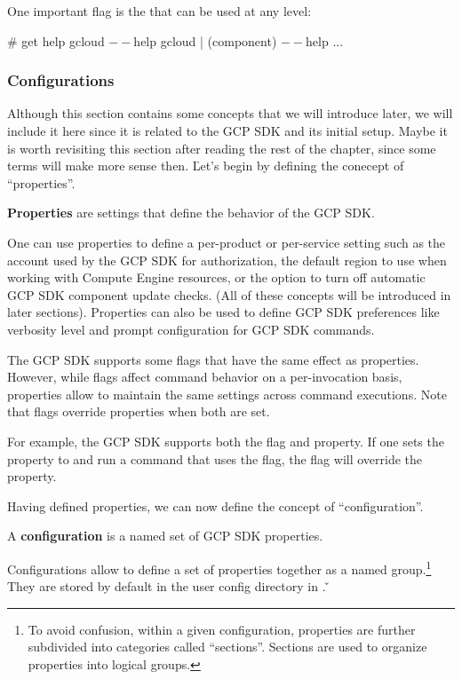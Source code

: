One important flag is the  that can be used at any  level:
\begin{bash}
# get help
gcloud $--$help
gcloud | (component) $--$help
...
\end{bash}

\subsubsection{Configurations}

Although this section contains some concepts that we will introduce later, we will include it here since it is related
to the GCP SDK and its initial setup. Maybe it is worth revisiting this section after reading the rest of the chapter,
since some terms will make more sense then. \v

Let's begin by defining the conecept of ``properties''.

\bd[Properties]
\textbf{Properties} are settings that define the behavior of the GCP SDK\@.
\ed

\be
One can use properties to define a per-product or per-service setting such as the account used by the GCP SDK for
authorization, the default region to use when working with Compute Engine resources, or the option to turn off
automatic GCP SDK component update checks. (All of these concepts will be introduced in later sections). Properties
can also be used to define GCP SDK preferences like verbosity level and prompt configuration for GCP SDK commands.
\ee

The GCP SDK supports some flags that have the same effect as properties. However, while flags affect command behavior
on a per-invocation basis, properties allow to maintain the same settings across command executions. Note that flags
override properties when both are set.

\be
For example, the GCP SDK supports both the  flag and  property. If one sets the
 property to  and run a command that uses the  flag, the flag will
override the property.
\ee

Having defined properties, we can now define the concept of ``configuration''.

\bd[Configuration]
A \textbf{configuration} is a named set of GCP SDK properties.
\ed

Configurations allow to define a set of properties together as a named group.\footnote{To avoid confusion, within a
given configuration, properties are further subdivided into categories called ``sections''. Sections are used to
organize properties into logical groups.} They are stored by default in the user config directory in
. \v

